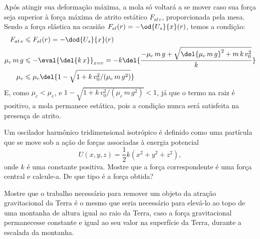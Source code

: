 \documentclass[]{IMTexam}
\begin{document}
\begin{questions}
\begin{solution}
		\item Após atingir sua deformação máxima, a mola só voltará a se mover caso sua força seja superior à força máxima de atrito estático $ F_{at\,e} $, proporcionada pela mesa. Sendo a força elástica na ocasião $ F_{el}(r)=-\od{U_s}{x}(r) $, temos a condição:
		\begin{align*}
			F_{at\,e}   & \leqslant F_{el}(r)=-\dod{U_s}{x}(r)                                                                           \\
			\mu_e\,m\,g & \leqslant -\eval{\del{k\,x}}_{x=r}= -k\del{\dfrac{-\mu_c\,m\,g+\sqrt{\del{\mu_c\,m\,g}^{2}+m\,k\,v_0^{2}}}{k}} \\
			\mu_e       & \leqslant \mu_c\del{1-\sqrt{1+k\,v_0^{2}/(\mu_c\,m\,g^{2})}}
		\end{align*}
		E, como $ \mu_c<\mu_e $, e $ 1-\sqrt{1+k\,v_0^{2}/(\mu_c\,m\,g^{2})}<1 $, já que o termo na raiz é positivo, a mola permanece estática, pois a condição nunca será satisfeita na presença de atrito.

		\en
	\end{solution}

	\question Um oscilador harmônico tridimensional isotrópico é definido como uma partícula que se move sob a ação de forças associadas à energia potencial
	\[ U(x, y, z) = \dfrac{1}{2}k(x^2 + y^2 + z^2), \]
	onde $ k $ é uma constante positiva. Mostre que a força correspondente é uma força central e calcule-a. De que tipo é a força obtida?

	\begin{solution}

	\end{solution}



	\question Mostre que o trabalho necessário para remover um objeto da atração gravitacional da Terra é o mesmo que seria necessário para elevá-lo ao topo de uma montanha de altura igual ao raio da Terra, caso a força gravitacional permanecesse constante e igual ao seu valor na superfície da Terra, durante a escalada da montanha.

	\begin{solution}

	\end{solution}

\end{questions}
\end{document}
